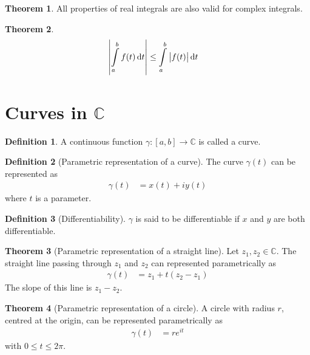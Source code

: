 \documentclass[titlepage, fleqn, a4paper, 12pt, twoside]{article}
\theoremstyle{definition}
\newtheorem{definition}{Definition}
\theoremstyle{theorem}
\newtheorem{theorem}{Theorem}
\begin{document}
\begin{theorem}
	All properties of real integrals are also valid for complex integrals.
\end{theorem}

\begin{theorem}
	\begin{align*}
		\left| \int\limits_{a}^{b} f(t) \dif t \right| & \le \int\limits_{a}^{b} \left| f(t) \right| \dif t
	\end{align*}
\end{theorem}

\section{Curves in $\mathbb{C}$}

\begin{definition}
	A continuous function $\gamma : [a,b] \to \mathbb{C}$ is called a curve.
\end{definition}

\begin{definition}[Parametric representation of a curve]
	The curve $\gamma(t)$ can be represented as
	\begin{align*}
		\gamma(t) & = x(t) + i y(t)
	\end{align*}
	where $t$ is a parameter.\\
\end{definition}

\begin{definition}[Differentiability]
	$\gamma$ is said to be differentiable if $x$ and $y$ are both differentiable.
\end{definition}

\begin{theorem}[Parametric representation of a straight line]
	Let $z_1,z_2 \in \mathbb{C}$.
	The straight line passing through $z_1$ and $z_2$ can represented parametrically as
	\begin{align*}
		\gamma(t) & = z_1 + t (z_2 - z_1)
	\end{align*}
	The slope of this line is $z_1 - z_2$.
\end{theorem}

\begin{theorem}[Parametric representation of a circle]
	A circle with radius $r$, centred at the origin, can be represented parametrically as
	\begin{align*}
		\gamma(t) & = r e^{i t}
	\end{align*}
	with $0 \le t \le 2 \pi$.
\end{theorem}
\end{document}

